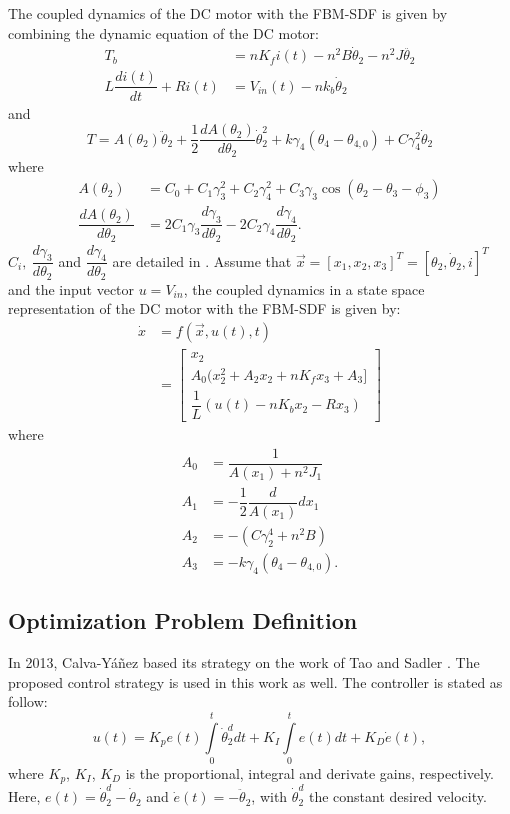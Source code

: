\documentclass[12pt,letterpape]{article}
\begin{document}
The coupled dynamics of the DC motor with the FBM-SDF is given by combining  the
dynamic equation of the DC motor:
\begin{align}
	T_b &= nK_f i(t) - n^2 B \dot{\theta}_2 - n^2 J \ddot{\theta_2} \\
	L \dfrac{di(t)}{dt} + Ri(t) &= V_{in} (t) - nk_b \dot{\theta}_2
\end{align}
and
$$
	T = A( \theta_2 ) \ddot{\theta}_2 + \frac{1}{2} \dfrac{dA(\theta_2)}{d\theta_2}
	\dot{\theta}_2^2 + k \gamma_4 ( \theta_4 - \theta_{4,0} ) + C \gamma_4^2 \dot{\theta}_2
$$
% 
where
\begin{align}
	A(\theta_2) &=  C_0 + C_1 \gamma_3^2 + C_2 \gamma_4^2 + C_3 \gamma_3 \cos(\theta_2-\theta_3-\phi_3)\\
	\dfrac{dA(\theta_2)}{d\theta_2} &= 2C_1 \gamma_3 \dfrac{d \gamma_3}{d \theta_2} -2C_2 \gamma_4 \dfrac{d \gamma_4}{d \theta_2}.
\end{align}
$C_i,\ \dfrac{d \gamma_3}{d \theta_2}$ and $ \dfrac{d \gamma_4}{d \theta_2 } $ are
detailed in \cite{calva13}.
% 
Assume that $ \vec{x} = [x_1,x_2,x_3]^T = [ \theta_2, \dot{\theta}_2,i ]^T $ and
the input vector $u = V_{in}$, the coupled dynamics in a state space representation
of the DC motor with the FBM-SDF is given by:
\begin{align}
	\dot{x} &= f( \vec{x}, u(t), t ) \\
	&= 
	\begin{bmatrix}
		x_2\\
		A_0( x_2^2 + A_2 x_2 + nK_f x_3 + A_3 ]\\
		\dfrac{1}{L} (u(t) - n K_b x_2 - R x_3)
	\end{bmatrix}
\end{align}
% 
where
\begin{align}
	A_0 &= \dfrac{1}{A(x_1) + n^2 J_1} \\
	A_1 &= -\dfrac{1}{2} \dfrac{d}{A(x_1)}{dx_1} \\
	A_2 &= - (C \gamma_2^4 + n^2 B ) \\
	A_3 &= -k \gamma_4( \theta_4 - \theta_{4,0} ).
\end{align}

\subsection{Optimization Problem Definition} %
\label{sec:optimization_problem_definition}

In 2013, Calva-Y{\'a}{\~n}ez \cite{calva13} based its strategy on the work of Tao
and Sadler \cite{tao95}. The proposed control strategy is used in this work as well.
The controller is stated as follow:
%
%
\begin{equation}
	u(t) =  K_{p} e(t) \int\limits_{0}^{t} \dot{\theta}_2^d dt 
	   			+ K_I\int\limits_{0}^{t} e(t) dt + K_D \dot{e}(t),
\end{equation}
%
where $K_p$, $K_I$, $K_D$ is the proportional, integral and derivate gains, 
respectively. Here, $e(t) = \dot{\theta}_2^d - \dot{\theta}_2 $ and
$\dot{e}(t) = - \ddot{\theta}_2 $, with $\dot{\theta}_2^d$ the constant desired velocity. \\
\end{document}
